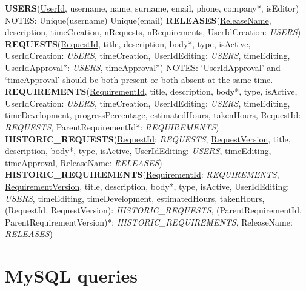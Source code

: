 \documentclass[12pt, a4paper]{report}
\begin{document}
\textbf{USERS}(\underline{UserId}, username, name, surname, email, phone, company*, isEditor)\newline
\newline
NOTES:\newline
Unique(username)\newline
Unique(email)\newline
\newline
\textbf{RELEASES}(\underline{ReleaseName}, description, timeCreation, nRequests, nRequirements,
UserIdCreation: \textit{USERS})\newline
\newline
\textbf{REQUESTS}(\underline{RequestId}, title, description, body*, type, isActive, UserIdCreation: \textit{USERS}, timeCreation,
UserIdEditing: \textit{USERS}, timeEditing, UserIdApproval*: \textit{USERS}, timeApproval*)\newline
\newline
NOTES:\newline
`UserIdApproval' and `timeApproval' should be both present or both absent at the same time.\newline
\newline
\textbf{REQUIREMENTS}(\underline{RequirementId}, title, description, body*, type, isActive, UserIdCreation: \textit{USERS},
timeCreation, UserIdEditing: \textit{USERS}, timeEditing, timeDevelopment, progressPercentage, estimatedHours, takenHours,
RequestId: \textit{REQUESTS}, ParentRequirementId*: \textit{REQUIREMENTS})\newline
\newline
\textbf{HISTORIC\_REQUESTS}(\underline{RequestId}: \textit{REQUESTS}, \underline{RequestVersion}, title, description, body*, type,
isActive, UserIdEditing: \textit{USERS}, timeEditing, timeApproval, ReleaseName: \textit{RELEASES})\newline
\newline
\textbf{HISTORIC\_REQUIREMENTS}(\underline{RequirementId}: \textit{REQUIREMENTS}, \underline{RequirementVersion}, title,
description, body*, type, isActive, UserIdEditing: \textit{USERS}, timeEditing,  timeDevelopment, estimatedHours, takenHours,
(RequestId, RequestVersion): \textit{HISTORIC\_REQUESTS},
(ParentRequirementId, ParentRequirementVersion)*: \textit{HISTORIC\_REQUIREMENTS}, ReleaseName: \textit{RELEASES})

\section*{MySQL queries}
\end{document}
